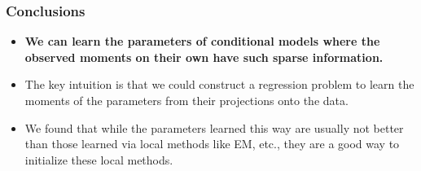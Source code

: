 \documentclass[xcolor={svgnames}]{beamer}
\begin{document}
\begin{frame}
  \frametitle{Conclusions}
  \begin{itemize}
    \item {\bf We can learn the parameters of conditional models where the observed moments on their own have such sparse information.}
    \item The key intuition is that we could construct a regression problem to learn the moments of the parameters from their projections onto the data.
    \item We found that while the parameters learned this way are usually not better than those learned via local methods like EM, etc., they are a good way to initialize these local methods.
  \end{itemize}
\end{frame}
\end{document}
